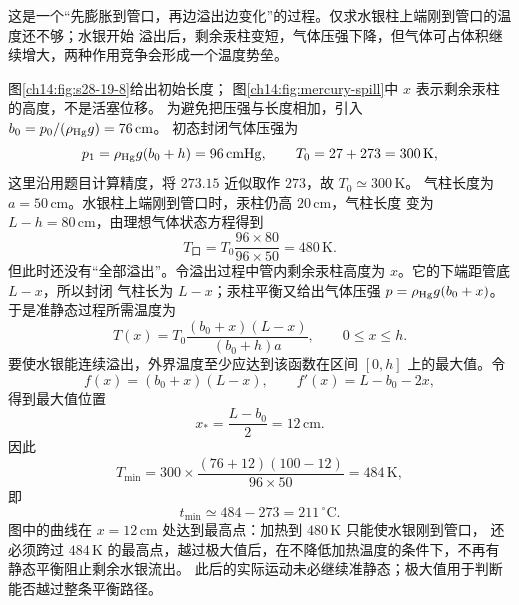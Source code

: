 \begin{xesolution}
这是一个“先膨胀到管口，再边溢出边变化”的过程。仅求水银柱上端刚到管口的温度还不够；水银开始
溢出后，剩余汞柱变短，气体压强下降，但气体可占体积继续增大，两种作用竞争会形成一个温度势垒。

\mercurySpillDiagram

图\ref{ch14:fig:s28-19-8}给出初始长度；
图\ref{ch14:fig:mercury-spill}中 $x$ 表示剩余汞柱的高度，不是活塞位移。
为避免把压强与长度相加，引入 $b_0=p_0/(\rho_{\rm Hg}g)=76\,\mathrm{cm}$。
初态封闭气体压强为
\begin{equation}
  p_1=\rho_{\rm Hg}g(b_0+h)=96\,\mathrm{cmHg},\qquad T_0=27+273=300\,\mathrm K,
\end{equation}
这里沿用题目计算精度，将 $273.15$ 近似取作 $273$，故 $T_0\simeq300\,\mathrm K$。
气柱长度为 $a=50\,\mathrm{cm}$。水银柱上端刚到管口时，汞柱仍高 $20\,\mathrm{cm}$，气柱长度
变为 $L-h=80\,\mathrm{cm}$，由理想气体状态方程得到
\begin{equation}
  T_{\text{口}}=T_0\frac{96\times80}{96\times50}=480\,\mathrm K.
\end{equation}
但此时还没有“全部溢出”。令溢出过程中管内剩余汞柱高度为 $x$。它的下端距管底 $L-x$，所以封闭
气柱长为 $L-x$；汞柱平衡又给出气体压强 $p=\rho_{\rm Hg}g(b_0+x)$。于是准静态过程所需温度为
\begin{equation}
  T(x)=T_0\frac{(b_0+x)(L-x)}{(b_0+h)a},\qquad 0\le x\le h.
\end{equation}
要使水银能连续溢出，外界温度至少应达到该函数在区间 $[0,h]$ 上的最大值。令
\begin{equation}
  f(x)=(b_0+x)(L-x),\qquad
  f'(x)=L-b_0-2x,
\end{equation}
得到最大值位置
\begin{equation}
  x_*=\frac{L-b_0}{2}=12\,\mathrm{cm}.
\end{equation}
因此
\begin{equation}
  T_{\min}=300\times\frac{(76+12)(100-12)}{96\times50}
  =484\,\mathrm K,
\end{equation}
即
\begin{equation}
  \boxed{t_{\min}\simeq484-273=211\,{}^\circ\mathrm C}.
\end{equation}
图中的曲线在 $x=12\,\mathrm{cm}$ 处达到最高点：加热到 $480\,\mathrm K$ 只能使水银刚到管口，
还必须跨过 $484\,\mathrm K$ 的最高点，越过极大值后，在不降低加热温度的条件下，不再有静态平衡阻止剩余水银流出。
此后的实际运动未必继续准静态；极大值用于判断能否越过整条平衡路径。
\end{xesolution}

